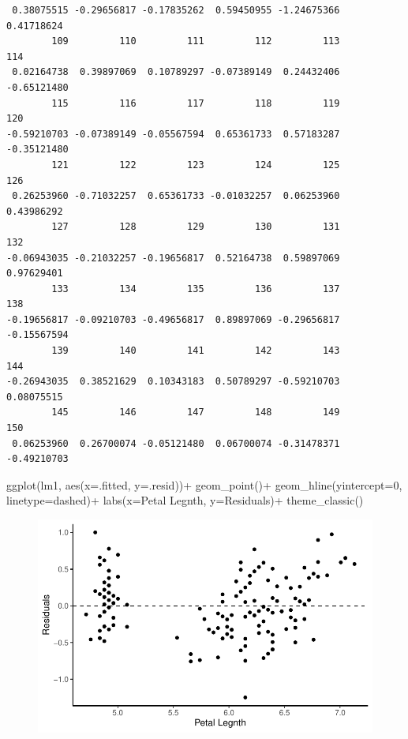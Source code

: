 \documentclass[
  letterpaper,
  DIV=11,
  numbers=noendperiod]{scrartcl}
\newenvironment{Shaded}{\begin{snugshade}}{\end{snugshade}}
\newcommand{\AttributeTok}[1]{\textcolor[rgb]{0.40,0.45,0.13}{#1}}
\newcommand{\DecValTok}[1]{\textcolor[rgb]{0.68,0.00,0.00}{#1}}
\newcommand{\FunctionTok}[1]{\textcolor[rgb]{0.28,0.35,0.67}{#1}}
\newcommand{\NormalTok}[1]{\textcolor[rgb]{0.00,0.23,0.31}{#1}}
\newcommand{\SpecialCharTok}[1]{\textcolor[rgb]{0.37,0.37,0.37}{#1}}
\newcommand{\StringTok}[1]{\textcolor[rgb]{0.13,0.47,0.30}{#1}}
\begin{document}
\begin{verbatim}
 0.38075515 -0.29656817 -0.17835262  0.59450955 -1.24675366  0.41718624 
        109         110         111         112         113         114 
 0.02164738  0.39897069  0.10789297 -0.07389149  0.24432406 -0.65121480 
        115         116         117         118         119         120 
-0.59210703 -0.07389149 -0.05567594  0.65361733  0.57183287 -0.35121480 
        121         122         123         124         125         126 
 0.26253960 -0.71032257  0.65361733 -0.01032257  0.06253960  0.43986292 
        127         128         129         130         131         132 
-0.06943035 -0.21032257 -0.19656817  0.52164738  0.59897069  0.97629401 
        133         134         135         136         137         138 
-0.19656817 -0.09210703 -0.49656817  0.89897069 -0.29656817 -0.15567594 
        139         140         141         142         143         144 
-0.26943035  0.38521629  0.10343183  0.50789297 -0.59210703  0.08075515 
        145         146         147         148         149         150 
 0.06253960  0.26700074 -0.05121480  0.06700074 -0.31478371 -0.49210703 
\end{verbatim}

\begin{Shaded}
\begin{Highlighting}[]
\FunctionTok{ggplot}\NormalTok{(lm1, }\FunctionTok{aes}\NormalTok{(}\AttributeTok{x=}\NormalTok{.fitted, }\AttributeTok{y=}\NormalTok{.resid))}\SpecialCharTok{+}
  \FunctionTok{geom\_point}\NormalTok{()}\SpecialCharTok{+}
  \FunctionTok{geom\_hline}\NormalTok{(}\AttributeTok{yintercept=}\DecValTok{0}\NormalTok{, }\AttributeTok{linetype=}\StringTok{\textquotesingle{}dashed\textquotesingle{}}\NormalTok{)}\SpecialCharTok{+}
  \FunctionTok{labs}\NormalTok{(}\AttributeTok{x=}\StringTok{\textquotesingle{}Petal Legnth\textquotesingle{}}\NormalTok{, }\AttributeTok{y=}\StringTok{\textquotesingle{}Residuals\textquotesingle{}}\NormalTok{)}\SpecialCharTok{+}
  \FunctionTok{theme\_classic}\NormalTok{()}
\end{Highlighting}
\end{Shaded}

\begin{figure}[H]

{\centering \includegraphics{cor_reg_chi_files/figure-pdf/unnamed-chunk-13-1.pdf}

}

\end{figure}
\end{document}
